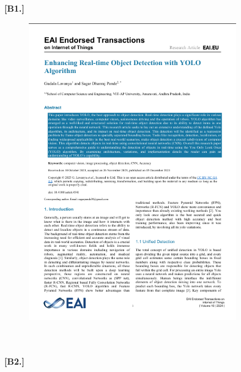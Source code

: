 %
%
\vspace{-5mm}
\textbf{[B1.]}
%
%
%
\begin{figure}[h!]
    \centering
    \includegraphics[width=0.8\textwidth]{reference_papers/Paper_1.png}
\end{figure}
%
%
\\\\
\textbf{[B2.]}
%
%
%
